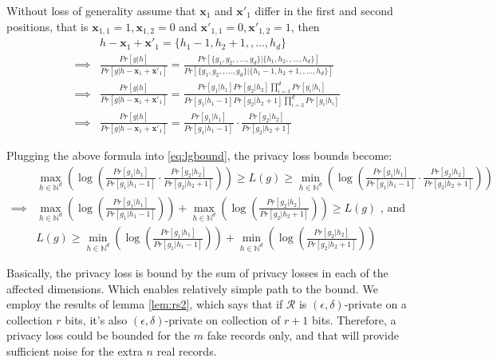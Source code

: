 \documentclass[11pt]{article}
\newcommand{\bbx}{\pmb{x}}
\newcommand{\cR}{\mathcal{R}}
\newcommand{\N}{\mathbb{N}}
\begin{document}
Without loss of generality assume that $\bbx_1$ and $\bbx'_1$ differ in the first and second positions, that is $\bbx_{1,1} = 1, \bbx_{1,2} = 0$ and $\bbx'_{1,1} = 0, \bbx'_{1,2} = 1$, then
\begin{align*}
 & h  - \bbx_1 + \bbx'_1 = \{ {h}_1 - 1, {h}_2 + 1, , \dots, {h}_d\} \\
 \implies &  \frac{  Pr [ g | h ]   } {    Pr [ g | h  - \bbx_1 + \bbx'_1  ]  } = \frac{ Pr [    \{ {g}_1, {g}_2, , \dots, {g}_d\} |  \{ {h}_1, {h}_2, , \dots, {h}_d\} ] } { Pr [    \{ {g}_1, {g}_2, , \dots, {g}_d\} |  \{ {h}_1 - 1, {h}_2 + 1, , \dots, {h}_d\} ]  } \\
  \implies &  \frac{  Pr [ g | h ]   } {    Pr [ g | h  - \bbx_1 + \bbx'_1  ]  } = \frac{  Pr[ g_1 | h_1] Pr[ g_2 | h_2] \prod_{i=3}^d Pr[ g_i | h_i]  } {  Pr[ g_1 | h_1 - 1] Pr[ g_2 | h_2 + 1] \prod_{i=3}^d Pr[ g_i | h_i]  }  \\
   \implies &  \frac{  Pr [ g | h ]   } {    Pr [ g | h  - \bbx_1 + \bbx'_1  ]  } =   \frac{  Pr[ g_1 | h_1]  } {  Pr[ g_1 | h_1 - 1]  } \cdot \frac{  Pr[ g_2 | h_2]  } {  Pr[ g_2 | h_2 + 1]  } 
\end{align*}

Plugging the above formula into \eqref{eq:lgbound}, the privacy loss bounds become:
\begin{align*}
& \max_{h \in \N^d}  \left ( \log \left (   \frac{  Pr[ g_1 | h_1]  } {  Pr[ g_1 | h_1 - 1]  } \cdot \frac{  Pr[ g_2 | h_2]  } {  Pr[ g_2 | h_2 + 1]  }  \right ) \right ) \ge L(g) \ge  \min_{h \in \N^d}  \left ( \log \left (  \frac{  Pr[ g_1 | h_1]  } {  Pr[ g_1 | h_1 - 1]  } \cdot \frac{  Pr[ g_2 | h_2]  } {  Pr[ g_2 | h_2 + 1]  }   \right ) \right ) \\
\implies &  \max_{h \in \N^d}  \left ( \log \left (   \frac{  Pr[ g_1 | h_1]  } {  Pr[ g_1 | h_1 - 1]  } \right ) \right )  + \max_{h \in \N^d}  \left ( \log  \left (\frac{  Pr[ g_2 | h_2]  } {  Pr[ g_2 | h_2 + 1]  }  \right) \right) \ge L(g) \text{ , and } \\
&  L(g) \ge \min_{h \in \N^d}  \left ( \log \left (   \frac{  Pr[ g_1 | h_1]  } {  Pr[ g_1 | h_1 - 1]  } \right ) \right )  + \min_{h \in \N^d}  \left ( \log  \left (\frac{  Pr[ g_2 | h_2]  } {  Pr[ g_2 | h_2 + 1]  }  \right) \right)
\end{align*}

Basically, the privacy loss is bound by the sum of privacy losses in each of the affected dimensions.  Which enables relatively simple path to the bound.   We employ the results of lemma \eqref{lem:rs2}, which says that if $\cR$ is $(\epsilon, \delta)$-private on a collection $r$ bits, it's also $(\epsilon, \delta)$-private on collection of $r+1$ bits.  Therefore, a privacy loss could be bounded for the $m$ fake records only, and that will provide sufficient noise for the extra $n$ real records.  
\end{document}
